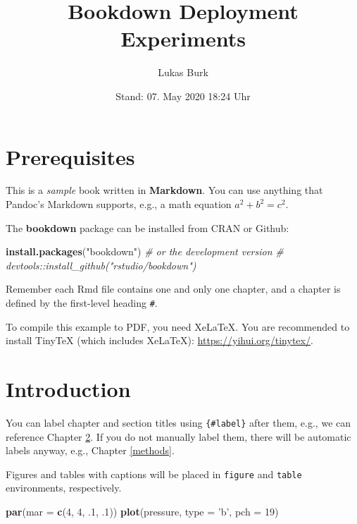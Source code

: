 \documentclass[ngerman,a4paper,]{scrartcl}
\title{Bookdown Deployment Experiments}
\author{Lukas Burk}
\date{Stand: 07. May 2020 18:24 Uhr}
\newenvironment{Shaded}{\begin{snugshade}}{\end{snugshade}}
\newcommand{\CommentTok}[1]{\textcolor[rgb]{0.56,0.35,0.01}{\textit{#1}}}
\newcommand{\DataTypeTok}[1]{\textcolor[rgb]{0.13,0.29,0.53}{#1}}
\newcommand{\DecValTok}[1]{\textcolor[rgb]{0.00,0.00,0.81}{#1}}
\newcommand{\FloatTok}[1]{\textcolor[rgb]{0.00,0.00,0.81}{#1}}
\newcommand{\KeywordTok}[1]{\textcolor[rgb]{0.13,0.29,0.53}{\textbf{#1}}}
\newcommand{\NormalTok}[1]{#1}
\newcommand{\StringTok}[1]{\textcolor[rgb]{0.31,0.60,0.02}{#1}}
\begin{document}
\maketitle

{
\hypersetup{linkcolor=}
\setcounter{tocdepth}{2}
\tableofcontents
}
\hypertarget{prerequisites}{%
\section{Prerequisites}\label{prerequisites}}

This is a \emph{sample} book written in \textbf{Markdown}. You can use anything that Pandoc's Markdown supports, e.g., a math equation \(a^2 + b^2 = c^2\).

The \textbf{bookdown} package can be installed from CRAN or Github:

\begin{Shaded}
\begin{Highlighting}[]
\KeywordTok{install.packages}\NormalTok{(}\StringTok{"bookdown"}\NormalTok{)}
\CommentTok{# or the development version}
\CommentTok{# devtools::install_github("rstudio/bookdown")}
\end{Highlighting}
\end{Shaded}

Remember each Rmd file contains one and only one chapter, and a chapter is defined by the first-level heading \texttt{\#}.

To compile this example to PDF, you need XeLaTeX. You are recommended to install TinyTeX (which includes XeLaTeX): \url{https://yihui.org/tinytex/}.

\hypertarget{intro}{%
\section{Introduction}\label{intro}}

You can label chapter and section titles using \texttt{\{\#label\}} after them, e.g., we can reference Chapter \ref{intro}. If you do not manually label them, there will be automatic labels anyway, e.g., Chapter \ref{methods}.

Figures and tables with captions will be placed in \texttt{figure} and \texttt{table} environments, respectively.

\begin{Shaded}
\begin{Highlighting}[]
\KeywordTok{par}\NormalTok{(}\DataTypeTok{mar =} \KeywordTok{c}\NormalTok{(}\DecValTok{4}\NormalTok{, }\DecValTok{4}\NormalTok{, }\FloatTok{.1}\NormalTok{, }\FloatTok{.1}\NormalTok{))}
\KeywordTok{plot}\NormalTok{(pressure, }\DataTypeTok{type =} \StringTok{'b'}\NormalTok{, }\DataTypeTok{pch =} \DecValTok{19}\NormalTok{)}
\end{Highlighting}
\end{Shaded}
\end{document}
